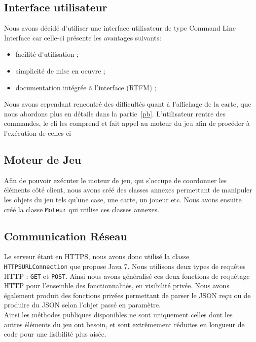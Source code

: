 	\subsection{Interface utilisateur}
		Nous avons décidé d'utiliser une interface utilisateur de type Command Line Interface car celle-ci présente les avantages suivants:
		\begin{itemize}
			\item facilité d'utilisation ;
			\item simplicité de mise en oeuvre ;
			\item documentation intégrée à l'interface (RTFM) ;
		\end{itemize}\bigskip
		Nous avons cependant rencontré des difficultés quant à l'affichage de la carte, que nous abordons plus en détails dans la partie~\ref{pb}. L'utilisateur rentre des commandes, le cli les comprend et fait appel au moteur du jeu afin de procéder à l'exécution de celles-ci

	\subsection{Moteur de Jeu}
		Afin de pouvoir exécuter le moteur de jeu, qui s'occupe de coordonner les éléments côté client, nous avons créé des classes annexes permettant de manipuler les objets du jeu tels qu'une case, une carte, un joueur etc. Nous avons ensuite créé la classe \texttt{Moteur} qui utilise ces classes annexes.

	\subsection{Communication Réseau}
		Le serveur étant en HTTPS, nous avons donc utilisé la classe \texttt{HTTPSURLConnection} que propose Java 7. Nous utilisons deux types de requêtes HTTP : \texttt{GET} et \texttt{POST}. Ainsi nous avons généralisé ces deux fonctions de requêtage HTTP pour l'ensemble des fonctionnalités, en visibilité privée. Nous avons également produit des fonctions privées permettant de parser le JSON reçu ou de produire du JSON selon l'objet passé en paramètre.\\

		Ainsi les méthodes publiques disponibles ne sont uniquement celles dont les autres éléments du jeu ont besoin, et sont extrêmement réduites en longueur de code pour une lisibilité plus aisée.
